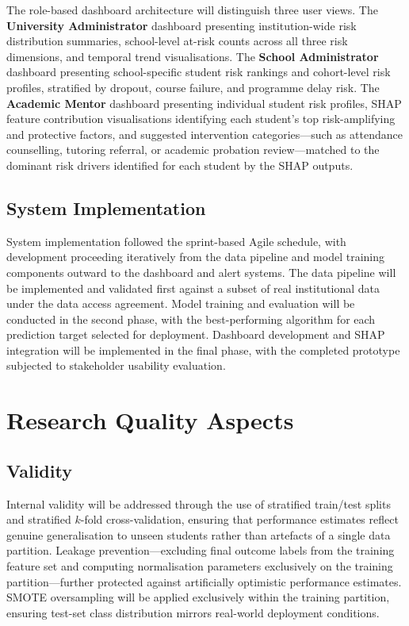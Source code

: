 \documentclass[12pt]{report}
\begin{document}
The role-based dashboard architecture will distinguish three user views. The
\textbf{University Administrator} dashboard presenting institution-wide risk
distribution summaries, school-level at-risk counts across all three risk
dimensions, and temporal trend visualisations. The \textbf{School Administrator}
dashboard presenting school-specific student risk rankings and cohort-level risk
profiles, stratified by dropout, course failure, and programme delay risk. The
\textbf{Academic Mentor} dashboard presenting individual student risk profiles,
SHAP feature contribution visualisations identifying each student's top
risk-amplifying and protective factors, and suggested intervention
categories---such as attendance counselling, tutoring referral, or academic
probation review---matched to the dominant risk drivers identified for each
student by the SHAP outputs.

\subsection{System Implementation}

System implementation followed the sprint-based Agile schedule, with development
proceeding iteratively from the data pipeline and model training components
outward to the dashboard and alert systems. The data pipeline will be implemented
and validated first against a subset of real institutional data under the data
access agreement. Model training and evaluation will be conducted in the second
phase, with the best-performing algorithm for each prediction target selected
for deployment. Dashboard development and SHAP integration will be implemented
in the final phase, with the completed prototype subjected to stakeholder
usability evaluation.

\section{Research Quality Aspects}

\subsection{Validity}

Internal validity will be addressed through the use of stratified train/test splits
and stratified $k$-fold cross-validation, ensuring that performance estimates
reflect genuine generalisation to unseen students rather than artefacts of a
single data partition. Leakage prevention---excluding final outcome labels from
the training feature set and computing normalisation parameters exclusively on
the training partition---further protected against artificially optimistic
performance estimates. SMOTE oversampling will be applied exclusively within the
training partition, ensuring test-set class distribution mirrors real-world
deployment conditions.
\end{document}
